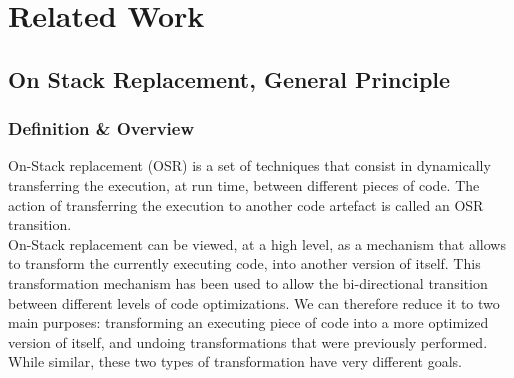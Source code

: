 
\chapter{Related Work} %

\label{Chapter2} %


\newcommand{\keyword}[1]{\textbf{#1}}
\newcommand{\tabhead}[1]{\textbf{#1}}
\newcommand{\code}[1]{\texttt{#1}}
\newcommand{\file}[1]{\texttt{\bfseries#1}}
\newcommand{\option}[1]{\texttt{\itshape#1}}


\section{On Stack Replacement, General Principle}

\subsection{Definition \& Overview}
On-Stack replacement (OSR) is a set of techniques that consist in dynamically transferring the execution, at run time, between different pieces of code.
The action of transferring the execution to another code artefact is called an OSR transition.\\

On-Stack replacement can be viewed, at a high level, as a mechanism that allows to transform the currently executing code, into another version of itself.
This transformation mechanism has been used to allow the bi-directional transition between different levels of code optimizations.
We can therefore reduce it to two main purposes: transforming an executing piece of code into a more optimized version of itself, and undoing transformations that were previously performed.
While similar, these two types of transformation have very different goals.\\

